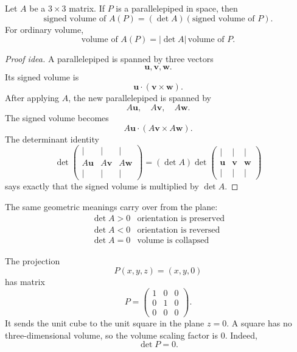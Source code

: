 \begin{theorem}
Let \(A\) be a \(3\times3\) matrix.  If \(P\) is a parallelepiped in space, then
\[
\boxed{
    \text{signed volume of }A(P)
    =
    (\det A)(\text{signed volume of }P).
}
\]
For ordinary volume,
\[
\boxed{
    \text{volume of }A(P)
    =
    |\det A|\,\text{volume of }P.
}
\]
\end{theorem}

\begin{proof}[Proof idea]
A parallelepiped is spanned by three vectors
\[
    \mathbf u,\mathbf v,\mathbf w.
\]
Its signed volume is
\[
    \mathbf u\cdot(\mathbf v\times\mathbf w).
\]
After applying \(A\), the new parallelepiped is spanned by
\[
    A\mathbf u,\quad A\mathbf v,\quad A\mathbf w.
\]
The signed volume becomes
\[
    A\mathbf u\cdot(A\mathbf v\times A\mathbf w).
\]
The determinant identity
\[
    \det
    \begin{pmatrix}
        |&|&|\\
        A\mathbf u&A\mathbf v&A\mathbf w\\
        |&|&|
    \end{pmatrix}
    =
    (\det A)
    \det
    \begin{pmatrix}
        |&|&|\\
        \mathbf u&\mathbf v&\mathbf w\\
        |&|&|
    \end{pmatrix}
\]
says exactly that the signed volume is multiplied by \(\det A\).
\end{proof}

The same geometric meanings carry over from the plane:
\[
\begin{array}{c|c}
\det A>0 & \text{orientation is preserved}\\
\det A<0 & \text{orientation is reversed}\\
\det A=0 & \text{volume is collapsed}
\end{array}
\]

\begin{example}
The projection
\[
    P(x,y,z)=(x,y,0)
\]
has matrix
\[
    P=
    \begin{pmatrix}
        1&0&0\\
        0&1&0\\
        0&0&0
    \end{pmatrix}.
\]
It sends the unit cube to the unit square in the plane \(z=0\).  A square has no
three-dimensional volume, so the volume scaling factor is \(0\).  Indeed,
\[
    \det P=0.
\]
\end{example}

